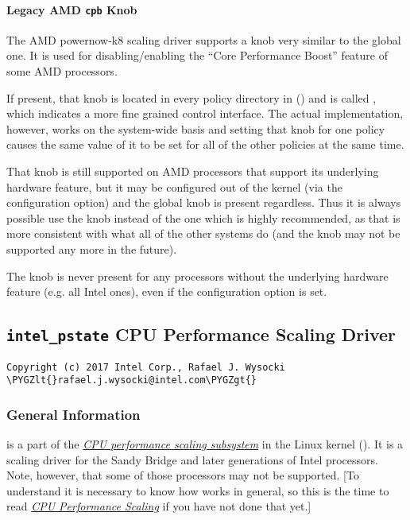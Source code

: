 \documentclass[a4paper,8pt,english]{sphinxmanual}
\def\PYGZlt{\char`\<}
\def\PYGZgt{\char`\>}
\begin{document}
\paragraph{Legacy AMD \texttt{cpb} Knob}
\label{admin-guide/pm/cpufreq:legacy-amd-cpb-knob}
The AMD powernow-k8 scaling driver supports a  knob very similar to
the global  one.  It is used for disabling/enabling the ``Core
Performance Boost'' feature of some AMD processors.

If present, that knob is located in every  policy directory in
 () and is called
, which indicates a more fine grained control interface.  The actual
implementation, however, works on the system-wide basis and setting that knob
for one policy causes the same value of it to be set for all of the other
policies at the same time.

That knob is still supported on AMD processors that support its underlying
hardware feature, but it may be configured out of the kernel (via the
 configuration option) and the global
 knob is present regardless.  Thus it is always possible use the
 knob instead of the  one which is highly recommended, as that
is more consistent with what all of the other systems do (and the  knob
may not be supported any more in the future).

The  knob is never present for any processors without the underlying
hardware feature (e.g. all Intel ones), even if the
 configuration option is set.


\subsection{\texttt{intel\_pstate} CPU Performance Scaling Driver}
\label{admin-guide/pm/intel_pstate:per-entity-load-tracking}\label{admin-guide/pm/intel_pstate::doc}\label{admin-guide/pm/intel_pstate:intel-pstate-cpu-performance-scaling-driver}
\begin{Verbatim}[commandchars=\\\{\}]
Copyright (c) 2017 Intel Corp., Rafael J. Wysocki \PYGZlt{}rafael.j.wysocki@intel.com\PYGZgt{}
\end{Verbatim}


\subsubsection{General Information}
\label{admin-guide/pm/intel_pstate:general-information}
 is a part of the
{\hyperref[admin\string-guide/pm/cpufreq::doc]{\emph{\emph{CPU performance scaling subsystem}}}} in the Linux kernel
().  It is a scaling driver for the Sandy Bridge and later
generations of Intel processors.  Note, however, that some of those processors
may not be supported.  {[}To understand  it is necessary to know
how  works in general, so this is the time to read {\hyperref[admin\string-guide/pm/cpufreq::doc]{\emph{\emph{CPU Performance Scaling}}}} if
you have not done that yet.{]}
\end{document}
